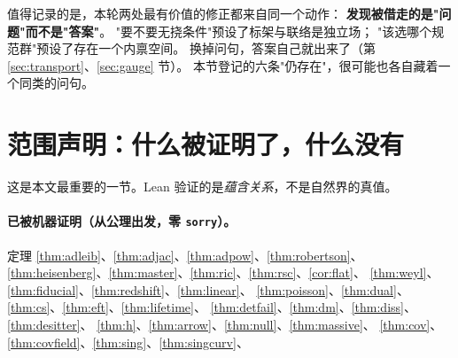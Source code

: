 \documentclass[11pt,a4paper]{article}
\theoremstyle{sudef}
\begin{document}
值得记录的是，本轮两处最有价值的修正都来自同一个动作：
\textbf{发现被借走的是"问题"而不是"答案"}。
"要不要无挠条件"预设了标架与联络是独立场；
"该选哪个规范群"预设了存在一个内禀空间。
换掉问句，答案自己就出来了（第 \ref{sec:transport}、\ref{sec:gauge} 节）。
本节登记的六条"仍存在"，很可能也各自藏着一个同类的问句。

\section{范围声明：什么被证明了，什么没有}\label{sec:scope}

这是本文最重要的一节。Lean 验证的是\emph{蕴含关系}，不是自然界的真值。

\paragraph{已被机器证明（从公理出发，零 \texttt{sorry}）。}
定理 \ref{thm:adleib}、\ref{thm:adjac}、\ref{thm:adpow}、\ref{thm:robertson}、
\ref{thm:heisenberg}、\ref{thm:master}、\ref{thm:ric}、\ref{thm:rsc}、\ref{cor:flat}、
\ref{thm:weyl}、\ref{thm:fiducial}、\ref{thm:redshift}、\ref{thm:linear}、
\ref{thm:poisson}、\ref{thm:dual}、\ref{thm:cs}、\ref{thm:eft}、\ref{thm:lifetime}、
\ref{thm:detfail}、\ref{thm:dm}、\ref{thm:diss}、\ref{thm:desitter}、
\ref{thm:h}、\ref{thm:arrow}、\ref{thm:null}、\ref{thm:massive}、
\ref{thm:cov}、\ref{thm:covfield}、\ref{thm:sing}、\ref{thm:singcurv}、
\end{document}
